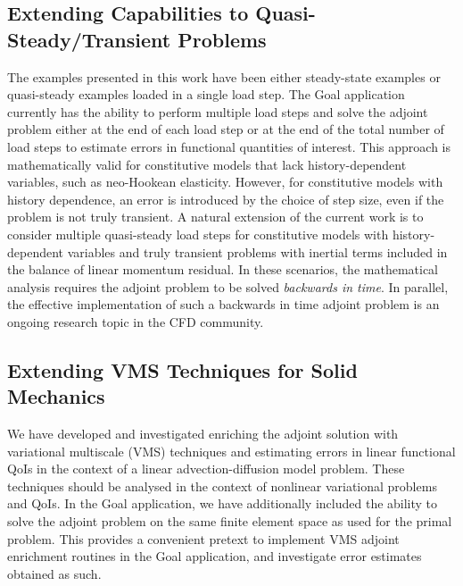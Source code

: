 \subsection{Extending Capabilities to Quasi-Steady/Transient Problems}

The examples presented in this work have been either steady-state examples
or quasi-steady examples loaded in a single load step.
The Goal application currently has the ability to perform multiple load
steps and solve the adjoint problem either at the end of each load step
or at the end of the total number of load steps to estimate errors in functional
quantities of interest. This approach is mathematically valid for constitutive
models that lack history-dependent variables, such as neo-Hookean elasticity.
However, for constitutive models with history dependence, an error is
introduced by the choice of step size, even if the problem is not truly
transient. A natural extension of the current work is to consider multiple
quasi-steady load steps for constitutive models with history-dependent variables
and truly transient problems with inertial terms included in the balance
of linear momentum residual. In these scenarios, the mathematical analysis
requires the adjoint problem to be solved \emph{backwards in time}.
In parallel, the effective implementation of such a backwards in time adjoint
problem is an ongoing research topic in the CFD community.

\subsection{Extending VMS Techniques for Solid Mechanics}

We have developed and investigated enriching the adjoint solution with
variational multiscale (VMS) techniques and estimating errors in
linear functional QoIs in the context of a linear advection-diffusion model problem.
These techniques should be analysed in the context of nonlinear variational
problems and QoIs. In the Goal application, we have additionally included
the ability to solve the adjoint problem on the same finite element space
as used for the primal problem. This provides a convenient pretext to
implement VMS adjoint enrichment routines in the Goal application, and
investigate error estimates obtained as such.
